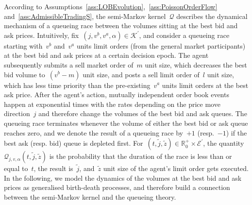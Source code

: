 \documentclass{amsart}[11pt]
\numberwithin{equation}{section}
\theoremstyle{definition}
\newcommand{\RR}{\mathbb{R}}
\newcommand{\Kk}{\mathcal{K}}
\newcommand{\Ee}{\mathcal{E}}
\newcommand{\Qq}{\mathcal{Q}}
\begin{document}
According to Assumptions~\ref{ass:LOBEvolution},~\ref{ass:PoissonOrderFlow} and~\ref{ass:AdmissibleTradingS},
the semi-Markov kernel~${\Qq}$ describes the dynamical mechanism of a {queueing race} between the volumes sitting at the best bid and ask prices.
Intuitively, fix~$\left(j, v^b, v^a, \alpha\right)\in \Kk^\prime$,
and consider a queueing race starting with~$v^b$ and~$v^a$ units limit orders 
(from the general market participants) 
at the best bid and ask prices at a certain decision epoch.
The agent subsequently submits a sell market order of~${m}$ unit size,
which decreases the best bid volume to~$({v}^b - {m})$ unit size,
and posts a sell limit order of~${l}$ unit size,
which has less time priority than the pre-existing~${v}^a$ units limit orders at the best ask price. 
After the agent's action, mutually independent order book events happen at exponential times with the rates depending on the price move direction~${j}$ and therefore change the volumes of the best bid and ask queues. 
The queueing race terminates whenever the volume of either the best bid or ask queue reaches zero,
and we denote the result of a queueing race by~$+1$ (resp.~$-1$) if the best ask (resp. bid) queue is depleted first.
For~$(t, \tilde{j}, \tilde{z})\in\RR^+_0\times \Ee^\prime$, 
the quantity~${\Qq}_{j, v, \alpha}(t, \tilde{j}, \tilde{z})$
is the probability that the duration of the race is less than or equal to~$t$,
the result is~$\tilde{j}$,
and~$\tilde{z}$ unit size of the agent's limit order gets executed. 
In the following,
we model the dynamics of the volumes at the best bid and ask prices 
as generalised birth-death processes, 
and therefore build a connection between the semi-Markov kernel and the queueing theory. 

\end{document}
